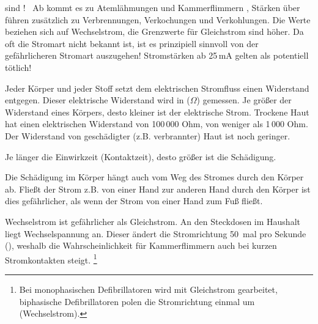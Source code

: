 {\begin{description}
{   sind !~\cite{BoehmerTaschRett6}
  Ab  kommt es zu Atemlähmungen und
  Kammerflimmern \cite{Jaros1}, Stärken über  führen zusätzlich zu
  Verbrennungen, Verkochungen und Verkohlungen. \cite{LPN3} Die Werte beziehen 
  sich auf Wechselstrom, die Grenzwerte für Gleichstrom sind höher. Da oft die 
  Stromart nicht bekannt ist, ist es prinzipiell sinnvoll von der
  gefährlicheren  Stromart auszugehen!} Stromstärken ab 25\,mA gelten als
  potentiell tötlich!
  \item {} Jeder Körper und
  jeder Stoff setzt dem elektrischen Stromfluss einen
  Widerstand entgegen. Dieser elektrische Widerstand wird in
   ($\Omega$) gemessen. Je größer der Widerstand eines
  Körpers, desto kleiner ist der elektrische Strom. Trockene
  Haut hat einen elektrischen Widerstand von 100\,000 Ohm,
   von
  weniger als 1\,000 Ohm. Der Widerstand von geschädigter
  (z.B. verbrannter) Haut ist noch geringer.
  \item[Einwirkdauer:] Je länger die Einwirkzeit (Kontaktzeit), desto
  größer ist die Schädigung.
  \item[Stromweg:] Die Schädigung im Körper hängt auch vom Weg des Stromes
  durch den Körper ab. Fließt der Strom z.B. von einer Hand zur anderen Hand
  durch den Körper ist dies gefährlicher, als wenn der Strom von einer Hand zum
  Fuß fließt.
  \item[Stromart:] Wechselstrom ist gefährlicher als Gleichstrom. An den
  Steckdosen im Haushalt liegt Wechselspannung an. Dieser ändert die
  Stromrichtung 50~mal pro Sekunde (), weshalb die
  Wahrscheinlichkeit für Kammerflimmern auch bei kurzen Stromkontakten steigt.
  \cite{RedelsteinerHRNS1} \footnote{Bei monophasischen Defibrillatoren wird mit
  Gleichstrom gearbeitet, biphasische Defibrillatoren polen die Stromrichtung
  einmal um (Wechselstrom).}
\end{description}



}{

}{}{}{}


